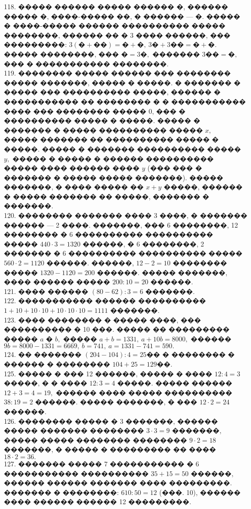 \documentclass[12pt]{article}
\begin{document}
118. ����� ������ ����� ������ �, ������ ����� �, ����-����� ��, � ������ --- �. ����� � ����-����� ������ ���������� ����� ��������, ������ �� � 3 ���� ������, ��� ���������: $3(\text{�}+\text{��})=\text{�}+\text{�},\ 3\text{�}+3\text{��}=\text{�}+\text{�}.$ ����� ��������, ��� $\text{�}=3\text{�},$ ������� $3\text{��}=\text{�},$ ��� � ����������� ��������.\\
119. �������� ����� ������ ��� �������� ����� �������, ����� � �����. � ������� � ����� ��� ���������� �����, ������ � ����������� �� �������� � � ����������� ���� ��� �������� ����� 0, ��� � ���������� ����� � �����. ����� � ������� � ����� ���������� ����� $x,$ ����� ������� �� ���������� ����� � �����. ����� � ������� ���������� ����� $y,$ ����� � ����� � ������ ���������� ����� ���� ������ ���� $y$ (��� ��� � ������� � ����� ����� �������). ����� �������, � ���� ����� �� $x+y$ �����, ������ � ����� ������� �� �����, ������� � �������.\\
120. �������� ������� ���� 3 ����, � ������� ������ --- 2 ����. �������, ��� 6 ��������, 12 �������� � 6 ���������� ���������� ����� $440\cdot3=1320$ ������, � 6 ��������, 2 ������� � 6 ���������� ���������� ����� $560\cdot2=1120$ ������. ������, $12-2=10$ �������� ����� $1320-1120=200$ ������. ����� �������, ���� ������ ����� $200:10=20$ ������.\\
121. ���� ������ $(80-62):3=6$ �������.\\
122. ����������� ������ ���������� $1+10+10\cdot10+10\cdot10\cdot10=1111$ �������.\\
123. ���� �������� � ����� ����, ��� ���������� � 10 ���. ����� �� ��������� ����� $a$ � $b,$ ����� $a+b=1331,\ a+10b=8000,$ ������ $9b=8000-1331=6669,\ b=741,\ a=1331-741=590.$\\
124. �� ������� $(204-104):4=25$�� � �������� � ������ � �������� $104+25=129$��.\\
125. ����� � ��� 12 ������, ����� � ���� $12:4=3$ �����, � � ���� $12:3=4$ �����. ����� ������ $12+3=4=19,$ ������ ���� ����� ���������� $38:19=2$ ������. ����� �������, � ��� $12\cdot2=24$ ������.\\
126. �������� ����� � 3 �������, ������ ����� ������� �������� $3\cdot3=9$ �������, ����� ����� �������� �������� $9\cdot2=18$ �������, � ����� � ��������� �� ���� $18\cdot2=36.$\\
127. ������� ����� 7 ����������� � 6 ����������� ���������� $35+15=50$ ������, ������ ������ ������� ���� ���������. ������� � ��������: $610:50=12$ (���. 10), ������ ���� ������ ������ 12 ���������.\\
\end{document}
